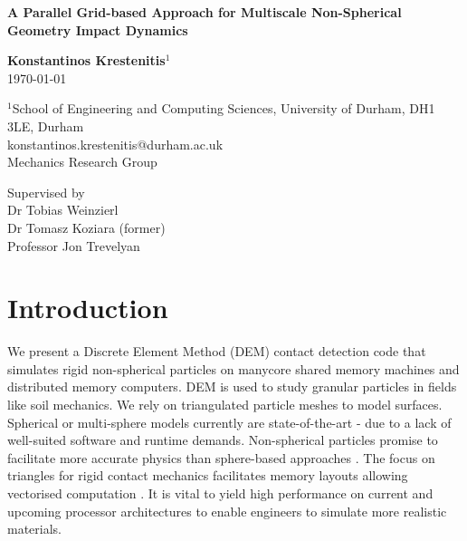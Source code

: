 \documentclass[times,12pt]{article}
\begin{document}
\pagestyle{plain}

\begin{center}
{\fontsize{22}{20}\bf A Parallel Grid-based Approach for Multiscale Non-Spherical Geometry Impact Dynamics\\
}\end{center}

\vspace{\fill}
\begin{center}\fontsize{16}{20}
\textbf{Konstantinos Krestenitis$^1$}\\
\today
\end{center}
\vspace{\fill}

\begin{center}
{\fontsize{10}{12}
}\end{center}

\begin{center}
$^1$School of Engineering and Computing Sciences, University of Durham, DH1 3LE, Durham\\
konstantinos.krestenitis@durham.ac.uk\\
Mechanics Research Group\\
\end{center}
\begin{center}
Supervised by\\
Dr Tobias Weinzierl\\
Dr Tomasz Koziara (former)\\
Professor Jon Trevelyan\\
\end{center}

\clearpage

\section{Introduction}
We present a Discrete Element Method (DEM) contact detection code that simulates rigid non-spherical particles on manycore shared memory machines and distributed memory computers. DEM is used to study granular particles in fields like soil mechanics. We rely on triangulated particle meshes to model surfaces. Spherical or multi-sphere models currently are state-of-the-art - due to a lack of well-suited software and runtime demands. Non-spherical particles promise to facilitate more accurate physics than sphere-based approaches \cite{AlonsoMarroqu2013}. The focus on triangles for rigid contact mechanics facilitates memory layouts allowing vectorised computation \cite{Alvarez2007, Koziara2005, Krestenitis2015}. It is vital to yield high performance on current and upcoming processor architectures to enable engineers to simulate more realistic materials.
\end{document}
